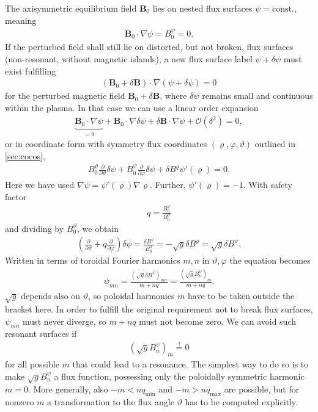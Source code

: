 \documentclass[a4paper, twoside, 10pt, english]{article}
\numberwithin{equation}{section}
\let\temp\varrho
\let\varrho\rho
\let\rho\temp
\let\temp\vartheta
\let\vartheta\theta
\let\theta\temp
\let\temp\varphi
\let\varphi\phi
\let\phi\temp
\let\vec\symbf
\newcommand*\grad{\ensuremath{\nabla}}
\newcommand*\pd[2][]{\ensuremath{\frac{\partial #1}{\partial #2}}}  %
\newcommand*\Bpert{\ensuremath{\delta \vec{B}}}  %
\begin{document}
The axisymmetric equilibrium field $\vec{B}_{0}$ lies on nested flux surfaces $\psi = \text{const.}$, meaning
\begin{gather*}
  \vec{B}_{0} \cdot \grad \psi = B_{0}^{\psi} = 0.
\end{gather*}
If the perturbed field shall still lie on distorted, but not broken, flux surfaces (non-resonant, without magnetic islands), a new flux surface label $\psi + \delta \psi$ must exist fulfilling
\begin{gather*}
  (\vec{B}_{0} + \Bpert) \cdot \grad (\psi + \delta \psi) = 0
\end{gather*}
for the perturbed magnetic field $\vec{B}_{0} + \Bpert$, where $\delta \psi$ remains small and continuous within the plasma. In that case we can use a linear order expansion
\begin{gather}
  \underbrace{\vec{B}_{0} \cdot \grad \psi}_{= 0} + \vec{B}_{0} \cdot \grad \delta \psi + \Bpert \cdot \grad \psi + \mathcal{O}(\delta^{2}) = 0,
\end{gather}
or in coordinate form with symmetry flux coordinates $(\rho, \phi, \theta)$ outlined in \cref{sec:cocos},
\begin{gather}
  B_{0}^{\theta} \pd{\theta} \delta \psi + B_{0}^{\phi} \pd{\phi} \delta \psi + \delta B^{\rho} \psi' (\rho) = 0.
\end{gather}
Here we have used $\grad \psi = \psi' (\rho) \grad \rho$. Further, $\psi' (\rho) = -1$. With safety factor
\begin{gather*}
  q = \frac{B_{0}^{\phi}}{B_{0}^{\theta}}
\end{gather*}
and dividing by $B_{0}^{\theta}$, we obtain
\begin{gather}
  \left ( \pd{\theta} + q \pd{\phi} \right ) \delta \psi = \frac{\delta B^{\rho}}{B_{0}^{\theta}} = -\sqrt{g} \delta B^{\rho} = \sqrt{g} \delta B^{\psi}.
\end{gather}
Written in terms of toroidal Fourier harmonics $m, n$ in $\theta, \phi$ the equation becomes
\begin{gather*}
  \psi_{m n} = \frac{\left ( \sqrt{g} \delta B^{\psi} \right )_{m n}}{m + n q} = \frac{\left ( \sqrt{g} B_{n}^{\psi} \right )_{m}}{m + n q}.
\end{gather*}
$\sqrt{g}$ depends also on $\theta$, so poloidal harmonics $m$ have to be taken outside the bracket here. In order to fulfill the original requirement not to break flux surfaces, $\psi_{m n}$ must never diverge, so $m + n q$ must not become zero. We can avoid such resonant surfaces if
\begin{gather}
  \left ( \sqrt{g} B_{n}^{\psi} \right )_{m} \overset{!}{=} 0
\end{gather}
for all possible $m$ that could lead to a resonance. The simplest way to do so is to make $\sqrt{g} B_{n}^{\psi}$ a flux function, possessing only the poloidally symmetric harmonic $m = 0$. More generally, also $-m < n q_{\text{min}}$ and $-m > n q_{\text{max}}$ are possible, but for nonzero $m$ a transformation to the flux angle $\theta$ has to be computed explicitly.
\end{document}

